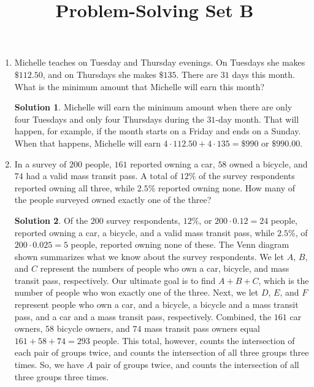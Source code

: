 \documentclass{article}
\title{Problem-Solving Set B}
\author{}
\date{}
\theoremstyle{definition}
\newtheorem*{solution}{Solution}
\begin{document}
\maketitle
\begin{multicols}{2}
    \begin{enumerate}
        \item Michelle teaches on Tuesday and Thursday evenings.
            On Tuesdays she makes $\$112.50$, and on Thursdays she makes $\$135$.
            There are $31$ days this month.
            What is the minimum amount that Michelle will earn this month?
            \begin{solution}
                Michelle will earn the minimum amount when there are only four Tuesdays and only four Thursdays during the $31$-day month.
                That will happen, for example, if the month starts on a Friday and ends on a Sunday.
                When that happens, Michelle will earn $4 \cdot 112.50 + 4 \cdot 135 = \$ 990$ or $\$ 990.00$.
            \end{solution}
        \item In a survey of $200$ people, $161$ reported owning a car, $58$ owned a bicycle, and $74$ had a valid mass transit pass.
            A total of $12\%$ of the survey respondents reported owning all three, while $2.5\%$ reported owning none.
            How many of the people surveyed owned exactly one of the three?
            \begin{solution}
                Of the $200$ survey respondents, $12\%$, or $200 \cdot 0.12 = 24$ people, reported owning a car, a bicycle, and a valid mass transit pass, while $2.5\%$, of $200 \cdot 0.025 = 5$ people, reported owning none of these.
                The Venn diagram shown summarizes what we know about the survey respondents.
                We let $A$, $B$, and $C$ represent the numbers of people who own a car, bicycle, and mass transit pass, respectively.
                Our ultimate goal is to find $A + B + C$, which is the number of people who won exactly one of the three.
                Next, we let $D$, $E$, and $F$ represent people who own a car, and a bicycle, a bicycle and a mass transit pass, and a car and a mass transit pass, respectively.
                Combined, the $161$ car owners, $58$ bicycle owners, and $74$ mass transit pass owners equal $161 + 58 + 74 = 293$ people.
                This total, however, counts the intersection of each pair of groups twice, and counts the intersection of all three groups three times.
                So, we have $A$ pair of groups twice, and counts the intersection of all three groups three times.

\end{solution}
\end{enumerate}
\end{multicols}
\end{document}
